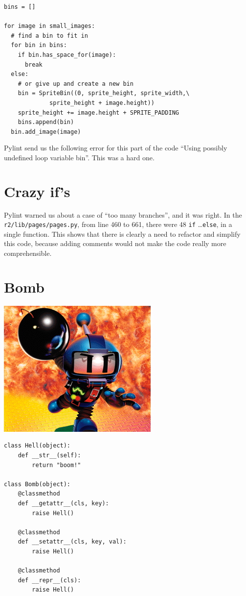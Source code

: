\documentclass[11pt, a4paper]{article}
\newcommand{\pyl}{\textsf{Pylint}}
\begin{document}
\begin{lstlisting}[caption=\texttt{r2/lib/nymph.py} at lines 123-135]
bins = []

for image in small_images:
  # find a bin to fit in
  for bin in bins:
    if bin.has_space_for(image):
      break
  else:
    # or give up and create a new bin
    bin = SpriteBin((0, sprite_height, sprite_width,\
    		 sprite_height + image.height))
    sprite_height += image.height + SPRITE_PADDING
    bins.append(bin)
  bin.add_image(image)
\end{lstlisting}


\pyl{} send us the following error for this part of the code \enquote{Using possibly undefined loop variable bin}. This was a hard one.

\section{Crazy if's}

\pyl{} warned us about a case of ``too many branches'', and it was right.
In the \texttt{r2/lib/pages/pages.py}, from line 460 to 661, there were 48 \lstinline|if| \dots \lstinline|else|, in a single function.
This shows that there is clearly a need to refactor and simplify this code, because adding comments would not make the code really more comprehensible.



\section{Bomb}

\includegraphics[scale=0.42]{atomic.png}


\begin{lstlisting}[caption=\texttt{r2/lib/utils/utils.py}]
class Hell(object):
    def __str__(self):
        return "boom!"

class Bomb(object):
    @classmethod
    def __getattr__(cls, key):
        raise Hell()

    @classmethod
    def __setattr__(cls, key, val):
        raise Hell()

    @classmethod
    def __repr__(cls):
        raise Hell()
\end{lstlisting}
\end{document}
